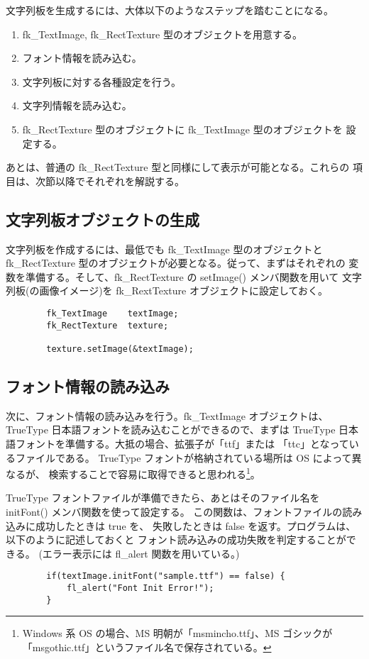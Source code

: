 文字列板を生成するには、大体以下のようなステップを踏むことになる。
\begin{enumerate}
 \item fk\_TextImage, fk\_RectTexture 型のオブジェクトを用意する。
 \item フォント情報を読み込む。
 \item 文字列板に対する各種設定を行う。
 \item 文字列情報を読み込む。
 \item fk\_RectTexture 型のオブジェクトに fk\_TextImage 型のオブジェクトを
	設定する。
\end{enumerate}
あとは、普通の fk\_RectTexture 型と同様にして表示が可能となる。これらの
項目は、次節以降でそれぞれを解説する。

\subsection{文字列板オブジェクトの生成}
文字列板を作成するには、最低でも fk\_TextImage 型のオブジェクトと
fk\_RectTexture 型のオブジェクトが必要となる。従って、まずはそれぞれの
変数を準備する。そして、fk\_RectTexture の setImage() メンバ関数を用いて
文字列板(の画像イメージ)を fk\_RextTexture オブジェクトに設定しておく。
\\
\begin{screen}
\begin{verbatim}
        fk_TextImage    textImage;
        fk_RectTexture  texture;

        texture.setImage(&textImage);
\end{verbatim}
\end{screen}

\subsection{フォント情報の読み込み}
次に、フォント情報の読み込みを行う。fk\_TextImage オブジェクトは、
TrueType 日本語フォントを読み込むことができるので、まずは TrueType
日本語フォントを準備する。大抵の場合、拡張子が「ttf」または
「ttc」となっているファイルである。
TrueType フォントが格納されている場所は OS によって異なるが、
検索することで容易に取得できると思われる\footnote{
Windows 系 OS の場合、MS 明朝が「msmincho.ttf」、MS ゴシックが
「msgothic.ttf」というファイル名で保存されている。}。

TrueType フォントファイルが準備できたら、あとはそのファイル名を
initFont() メンバ関数を使って設定する。
この関数は、フォントファイルの読み込みに成功したときは true を、
失敗したときは false を返す。プログラムは、以下のように記述しておくと
フォント読み込みの成功失敗を判定することができる。
(エラー表示には fl\_alert 関数を用いている。)
\\
\begin{screen}
\begin{verbatim}
        if(textImage.initFont("sample.ttf") == false) {
            fl_alert("Font Init Error!");
        }
\end{verbatim}
\end{screen}

